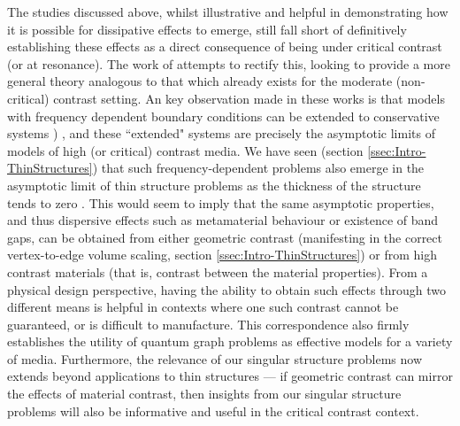 The studies discussed above, whilst illustrative and helpful in demonstrating how it is possible for dissipative effects to emerge, still fall short of definitively establishing these effects as a direct consequence of being under critical contrast (or at resonance).
The work of \cite{cherednichenko2019unified, cherednichenko2019time} attempts to rectify this, looking to provide a more general theory analogous to that which already exists for the moderate (non-critical) contrast setting.
An key observation made in these works is that models with frequency dependent boundary conditions can be extended to conservative systems ) , and these ``extended" systems are precisely the asymptotic limits of models of high (or critical) contrast media.
We have seen (section \ref{ssec:Intro-ThinStructures}) that such frequency-dependent problems also emerge in the asymptotic limit of thin structure problems as the thickness of the structure tends to zero .
This would seem to imply that the same asymptotic properties, and thus dispersive effects such as metamaterial behaviour or existence of band gaps, can be obtained from either geometric contrast (manifesting in the correct vertex-to-edge volume scaling, section \ref{ssec:Intro-ThinStructures}) or from high contrast materials (that is, contrast between the material properties).
From a physical design perspective, having the ability to obtain such effects through two different means is helpful in contexts where one such contrast cannot be guaranteed, or is difficult to manufacture.
This correspondence also firmly establishes the utility of quantum graph problems as effective models for a variety of media.
Furthermore, the relevance of our singular structure problems now extends beyond applications to thin structures --- if geometric contrast can mirror the effects of material contrast, then insights from our singular structure problems will also be informative and useful in the critical contrast context.